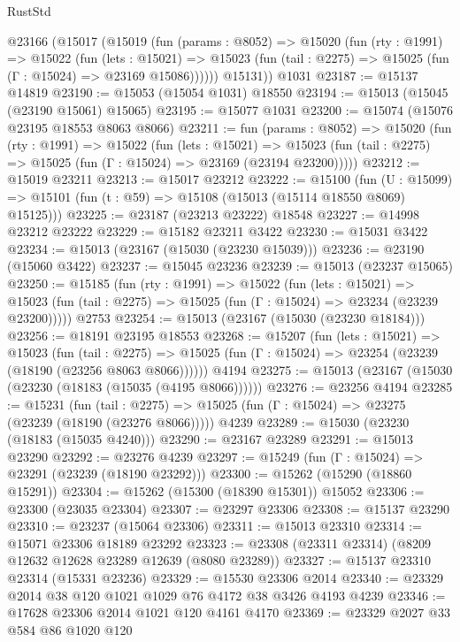 \begin{lexlean}{RustStd}
\begin{coremodule}
    @23166
      (@15017
        (@15019
          (fun (params : @8052) =>
          @15020
            (fun (rty : @1991) =>
            @15022
              (fun (lets : @15021) =>
              @15023 (fun (tail : @2275) => @15025 (fun (Γ : @15024) => @23169 @15086))))))
        @15131))
    @1031
@23187 := @15137 @14819
@23190 := @15053 (@15054 @1031) @18550
@23194 := @15013 (@15045 (@23190 @15061) @15065)
@23195 := @15077 @1031
@23200 := @15074 (@15076 @23195 @18553 @8063 @8066)
@23211 := fun (params : @8052) =>
  @15020
    (fun (rty : @1991) =>
    @15022
      (fun (lets : @15021) =>
      @15023 (fun (tail : @2275) => @15025 (fun (Γ : @15024) => @23169 (@23194 @23200)))))
@23212 := @15019 @23211
@23213 := @15017 @23212
@23222 := @15100
    (fun (U : @15099) => @15101 (fun (t : @59) => @15108 (@15013 (@15114 @18550 @8069) @15125)))
@23225 := @23187 (@23213 @23222) @18548
@23227 := @14998 @23212 @23222
@23229 := @15182 @23211 @3422
@23230 := @15031 @3422
@23234 := @15013 (@23167 (@15030 (@23230 @15039)))
@23236 := @23190 (@15060 @3422)
@23237 := @15045 @23236
@23239 := @15013 (@23237 @15065)
@23250 := @15185
    (fun (rty : @1991) =>
    @15022
      (fun (lets : @15021) =>
      @15023 (fun (tail : @2275) => @15025 (fun (Γ : @15024) => @23234 (@23239 @23200)))))
    @2753
@23254 := @15013 (@23167 (@15030 (@23230 @18184)))
@23256 := @18191 @23195 @18553
@23268 := @15207
    (fun (lets : @15021) =>
    @15023
      (fun (tail : @2275) =>
      @15025 (fun (Γ : @15024) => @23254 (@23239 (@18190 (@23256 @8063 @8066))))))
    @4194
@23275 := @15013 (@23167 (@15030 (@23230 (@18183 (@15035 (@4195 @8066))))))
@23276 := @23256 @4194
@23285 := @15231
    (fun (tail : @2275) => @15025 (fun (Γ : @15024) => @23275 (@23239 (@18190 (@23276 @8066)))))
    @4239
@23289 := @15030 (@23230 (@18183 (@15035 @4240)))
@23290 := @23167 @23289
@23291 := @15013 @23290
@23292 := @23276 @4239
@23297 := @15249 (fun (Γ : @15024) => @23291 (@23239 (@18190 @23292)))
@23300 := @15262 (@15290 (@18860 @15291))
@23304 := @15262 (@15300 (@18390 @15301)) @15052
@23306 := @23300 (@23035 @23304)
@23307 := @23297 @23306
@23308 := @15137 @23290
@23310 := @23237 (@15064 @23306)
@23311 := @15013 @23310
@23314 := @15071 @23306 @18189 @23292
@23323 := @23308 (@23311 @23314) (@8209 @12632 @12628 @23289 @12639 (@8080 @23289))
@23327 := @15137 @23310 @23314 (@15331 @23236)
@23329 := @15530 @23306 @2014
@23340 := @23329 @2014 @38 @120 @1021 @1029 @76 @4172 @38 @3426 @4193 @4239
@23346 := @17628 @23306 @2014 @1021 @120 @4161 @4170
@23369 := @23329
    @2027
    @33
    @584
    @86
    @1020
    @120

\end{coremodule}
\end{lexlean}

